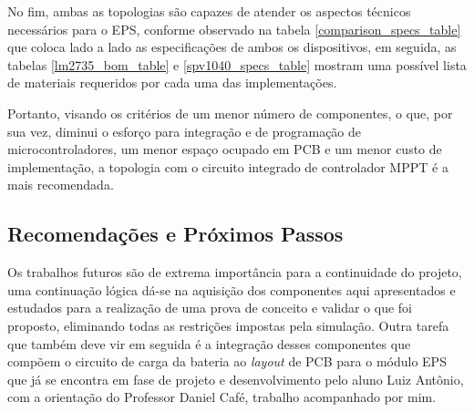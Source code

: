 



No fim, ambas as topologias são capazes de atender os aspectos técnicos necessários para o EPS, conforme observado na tabela \ref{comparison_specs_table} que coloca lado a lado as especificações de ambos os dispositivos, em seguida, as tabelas \ref{lm2735_bom_table} e \ref{spv1040_specs_table} mostram uma possível lista de materiais requeridos por cada uma das implementações.



Portanto, visando os critérios de um menor número de componentes, o que, por sua vez, diminui o esforço para integração e de programação de microcontroladores, um menor espaço ocupado em PCB e um menor custo de implementação, a topologia com o circuito integrado de controlador MPPT é a mais recomendada.

\subsection*{Recomendações e Próximos Passos}

Os trabalhos futuros são de extrema importância para a continuidade do projeto, uma continuação lógica dá-se na aquisição dos componentes aqui apresentados e estudados para a realização de uma prova de conceito e validar o que foi proposto, eliminando todas as restrições impostas pela simulação. Outra tarefa que também deve vir em seguida é a integração desses componentes que compõem o circuito de carga da bateria ao \textit{layout} de PCB para o módulo EPS que já se encontra em fase de projeto e desenvolvimento pelo aluno Luiz Antônio, com a orientação do Professor Daniel Café, trabalho acompanhado por mim.

